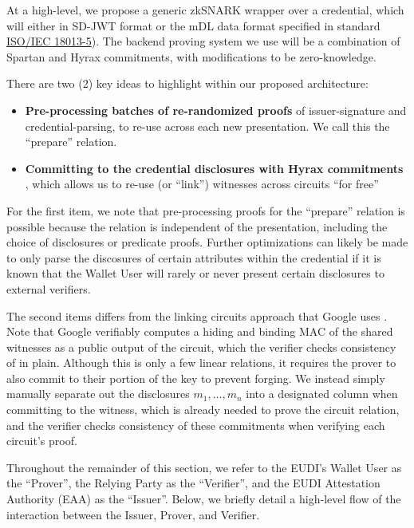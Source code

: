 At a high-level, we propose a generic zkSNARK wrapper over a credential, which will either in SD-JWT format or the mDL data format specified in standard \href{https://mobiledl-e5018.web.app/ISO_18013-5_E_draft.pdf}{ISO/IEC 18013-5}). The backend proving system we use will be a combination of Spartan and Hyrax commitments, with modifications to be zero-knowledge. 

There are two (2) key ideas to highlight within our proposed architecture:

\begin{itemize}
    \item \textbf{Pre-processing batches of re-randomized proofs} of issuer-signature and credential-parsing, to re-use across each new presentation. We call this the ``prepare'' relation.
    \item \textbf{Committing to the credential disclosures with Hyrax commitments} \cite{cryptoeprint:2017/1132}, which allows us to re-use (or ``link'') witnesses across circuits ``for free''
\end{itemize}

For the first item, we note that pre-processing proofs for the ``prepare'' relation is possible because the relation is independent of the presentation, including the choice of disclosures or predicate proofs. Further optimizations can likely be made to only parse the discosures of certain attributes within the credential if it is known that the Wallet User will rarely or never present certain disclosures to external verifiers.

The second items differs from the linking circuits approach that Google uses \cite{cryptoeprint:2024/2010}. Note that Google verifiably computes a hiding and binding MAC of the shared witnesses as a public output of the circuit, which the verifier checks consistency of in plain. Although this is only a few linear relations, it requires the prover to also commit to their portion of the key to prevent forging. We instead simply manually separate out the disclosures $m_1, \dots, m_n$ into a designated column when committing to the witness, which is already needed to prove the circuit relation, and the verifier checks consistency of these commitments when verifying each circuit's proof.

Throughout the remainder of this section, we refer to the EUDI's Wallet User as the ``Prover'', the Relying Party as the ``Verifier'', and the EUDI Attestation Authority (EAA) as the ``Issuer''. Below, we briefly detail a high-level flow of the interaction between the Issuer, Prover, and Verifier.


